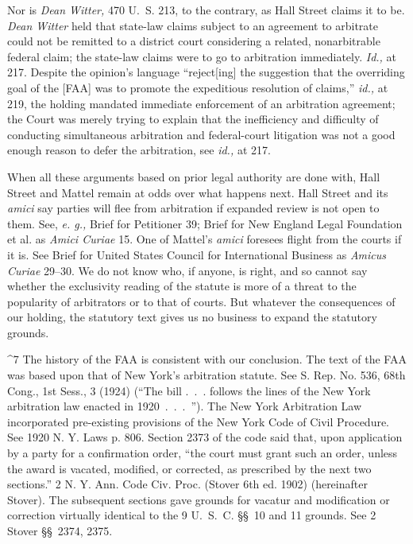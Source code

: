   Nor is \emph{Dean Witter,} 470 U.~S. 213, to the contrary, as Hall
Street claims it to be. \emph{Dean Witter} held that state-law claims
subject to an agreement to arbitrate could not be remitted to a district
court considering a related, nonarbitrable federal claim; the state-law
claims were to go to arbitration immediately. \emph{Id.,} at 217.
Despite the opinion's language ``reject[ing] the suggestion that the
overriding goal of the [FAA] was to promote the expeditious resolution
of claims,'' \emph{id.,} at 219, the holding mandated immediate
enforcement of an arbitration agreement; the Court was merely trying to
explain that the inefficiency and difficulty of conducting simultaneous
arbitration and federal-court litigation was not a good enough reason to
defer the arbitration, see \emph{id.,} at 217.

  When all these arguments based on prior legal authority are done with,
Hall Street and Mattel remain at odds over what happens next. Hall
Street and its \emph{amici} say parties \newpage  will flee from arbitration
if expanded review is not open to them. See, \emph{e. g.,} Brief for
Petitioner 39; Brief for New England Legal Foundation et al. as \emph{Amici
Curiae} 15. One of Mattel's \emph{amici} foresees flight from the
courts if it is. See Brief for United States Council for International
Business as \emph{Amicus Curiae} 29--30. We do not know who, if anyone,
is right, and so cannot say whether the exclusivity reading of the
statute is more of a threat to the popularity of arbitrators or to that
of courts. But whatever the consequences of our holding, the statutory
text gives us no business to expand the statutory grounds.\footnotemark[7]\newpage 

^7 The history of the FAA is consistent with our conclusion. The text
of the FAA was based upon that of New York's arbitration statute.
See S. Rep. No. 536, 68th Cong., 1st Sess., 3 (1924) (``The bill
.~.~. follows the lines of the New York arbitration law enacted
in 1920~.~.~.~''). The New York Arbitration Law incorporated
pre-existing provisions of the New York Code of Civil Procedure. See
1920 N. Y. Laws p. 806. Section 2373 of the code said that, upon
application by a party for a confirmation order, ``the court must grant
such an order, unless the award is vacated, modified, or corrected, as
prescribed by the next two sections.'' 2 N. Y. Ann. Code Civ. Proc.
(Stover 6th ed. 1902) (hereinafter Stover). The subsequent sections
gave grounds for vacatur and modification or correction virtually
identical to the 9 U.~S.~C. \S\S~10 and 11 grounds. See 2 Stover
\S\S~2374, 2375.

